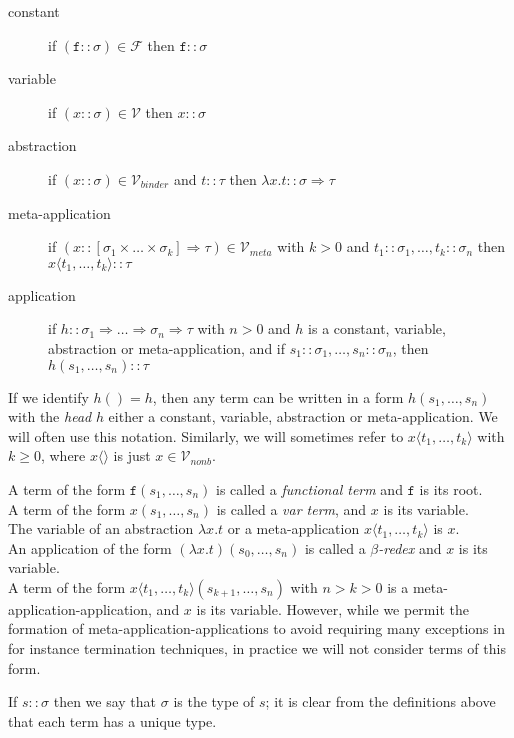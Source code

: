 \documentclass{lmcs}
\theoremstyle{theorem}\newtheorem{theorem}{Theorem}
\theoremstyle{theorem}\newtheorem{lemma}[theorem]{Lemma}
\theoremstyle{theorem}\newtheorem{corollary}[theorem]{Corollary}
\theoremstyle{definition}\newtheorem{definition}[theorem]{Definition}
\theoremstyle{definition}\newtheorem{example}[theorem]{Example}
\newcommand{\F}{\mathcal{F}}
\newcommand{\V}{\mathcal{V}}
\newcommand{\Vmeta}{\mathcal{V}_{\mathit{meta}}}
\newcommand{\Vfree}{\mathcal{V}_{\mathit{nonb}}}
\newcommand{\Vbound}{\mathcal{V}_{\mathit{binder}}}
\newcommand{\atype}{\sigma}
\newcommand{\btype}{\tau}
\newcommand{\identifier}[1]{\mathtt{#1}}
\newcommand{\afun}{\identifier{f}}
\newcommand{\avar}{x}
\newcommand{\abs}[2]{\lambda #1.#2}
\newcommand{\meta}[2]{#1\langle#2\rangle}
\newcommand{\arrtype}{\Rightarrow}
\begin{document}
\begin{description}
\item[constant] if $(\afun :: \atype) \in \F$ then $\afun :: \atype$
\item[variable] if $(\avar :: \atype) \in \V$ then $\avar :: \atype$
\item[abstraction] if $(\avar :: \atype) \in \Vbound$ and $t :: \btype$ then $\abs{\avar}{t} ::
  \atype \arrtype \btype$
\item[meta-application] if $(\avar :: [\atype_1 \times \dots \times \atype_k] \arrtype \btype) \in
  \Vmeta$ with $k > 0$ and $t_1 :: \atype_1,\dots,t_k :: \atype_n$ then $\meta{\avar}{t_1,\dots,t_k}
  :: \btype$
\item[application] if $h :: \atype_1 \arrtype \dots \arrtype \atype_n \arrtype \btype$ with $n > 0$
  and $h$ is a constant, variable, abstraction or meta-application,
  and if $s_1 :: \atype_1,\dots,s_n :: \atype_n$,
  then $h(s_1,\dots,s_n) :: \btype$
\end{description}

If we identify $h() = h$, then any term can be written in a form $h(s_1,\dots,s_n)$ with the
\emph{head} $h$ either a constant, variable, abstraction or meta-application.  We will often use
this notation.
Similarly, we will sometimes refer to $\meta{\avar}{t_1,\dots,t_k}$ with $k \geq 0$, where
$\meta{\avar}{}$ is just $\avar \in \Vfree$.

A term of the form $\afun(s_1,\dots,s_n)$ is called a \emph{functional term} and $\afun$ is its
root. \\
A term of the form $\avar(s_1,\dots,s_n)$ is called a \emph{var term}, and $\avar$ is its
variable. \\
The variable of an abstraction $\abs{\avar}{t}$ or a meta-application $\meta{x}{t_1,\dots,t_k}$ is
$\avar$. \\
An application of the form $(\abs{\avar}{t})(s_0,\dots,s_n)$ is called a \emph{$\beta$-redex} and
$\avar$ is its variable. \\
A term of the form $\meta{x}{t_1,\dots,t_k}(s_{k+1},\dots,s_n)$ with $n > k > 0$ is a
meta-application-application, and $\avar$ is its variable.  However, while we permit the formation
of meta-application-applications to avoid requiring many exceptions in for instance termination
techniques, in practice we will not consider terms of this form.

If $s :: \atype$ then we say that $\atype$ is the type of $s$; it is clear from the definitions
above that each term has a unique type.
\end{document}
